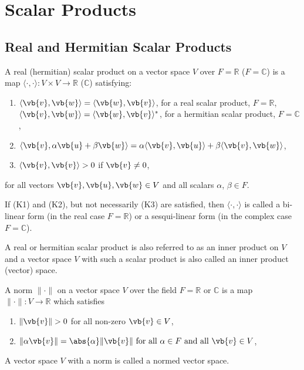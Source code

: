 \documentclass[a4paper,12pt]{report}
\begin{document}
\chapter{Scalar Products} \label{dot} 

\section{Real and Hermitian Scalar Products}

\begin{definition} \label{scalarproduct} 
    A real (hermitian) scalar product on a vector space \( V \) over \( F = \mathbb{R} \) (\( F = \mathbb{C} \)) is a map \(\langle \cdot, \cdot \rangle : V \times V \rightarrow \mathbb{R} \) (\( \mathbb{C} \)) satisfying:
    \begin{enumerate}[label=(\(K\)\arabic*)]
        \item \(\langle \vb{v}, \vb{w} \rangle = \langle \vb{w}, \vb{v} \rangle\), for a real scalar product, \( F = \mathbb{R} \),\\
              \(\langle \vb{v}, \vb{w} \rangle = \langle \vb{w}, \vb{v} \rangle^*\), for a hermitian scalar product, \( F = \mathbb{C} \),
        \item \(\langle \vb{v}, \alpha \vb{u} + \beta \vb{w} \rangle = \alpha \langle \vb{v}, \vb{u} \rangle + \beta \langle \vb{v}, \vb{w} \rangle\),
        \item \(\langle \vb{v}, \vb{v} \rangle > 0\) if \(\vb{v} \neq 0\),
    \end{enumerate}
    for all vectors \(\vb{v}, \vb{u}, \vb{w} \in V\) and all scalars \(\alpha\), \(\beta \in F\).
    
    If (K1) and (K2), but not necessarily (K3) are satisfied, then \(\langle \cdot, \cdot \rangle\) is called a bi-linear form (in the real case \( F = \mathbb{R} \)) or a sesqui-linear form (in the complex case \( F = \mathbb{C} \)).

    A real or hermitian scalar product is also referred to as an inner product on \(V\) and a vector space \(V\) with such a scalar product is also called an inner product (vector) space.
\end{definition}


\begin{definition}
    A norm \(\lVert \cdot  \rVert \) on a vector space \(V\) over the field \(F = \mathbb{R} \text { or } \mathbb{C}\) is a map \(\lVert \cdot  \rVert : V \to \mathbb{R}\) which satisfies 

    \begin{enumerate}[label=(L\arabic*)]
        \item \(\lVert \vb{v}  \rVert > 0 \) for all non-zero \(\vb{v} \in V\),
        \item \(\lVert \alpha \vb{v}  \rVert = \abs{\alpha } \lVert \vb{v}  \rVert \text{ for all } \alpha \in  F \text { and all } \vb{v} \in V    \),
    \end{enumerate}
    
    A vector space \(V\) with a norm is called a normed vector space.
\end{definition}
\end{document}
